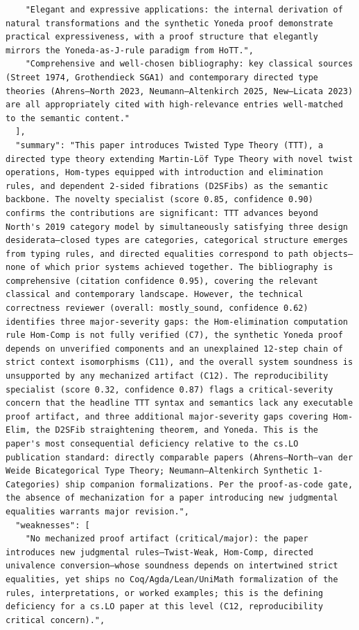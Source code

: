 \documentclass[11pt]{article}
\begin{document}
\begin{verbatim}
    "Elegant and expressive applications: the internal derivation of natural transformations and the synthetic Yoneda proof demonstrate practical expressiveness, with a proof structure that elegantly mirrors the Yoneda-as-J-rule paradigm from HoTT.",
    "Comprehensive and well-chosen bibliography: key classical sources (Street 1974, Grothendieck SGA1) and contemporary directed type theories (Ahrens–North 2023, Neumann–Altenkirch 2025, New–Licata 2023) are all appropriately cited with high-relevance entries well-matched to the semantic content."
  ],
  "summary": "This paper introduces Twisted Type Theory (TTT), a directed type theory extending Martin-Löf Type Theory with novel twist operations, Hom-types equipped with introduction and elimination rules, and dependent 2-sided fibrations (D2SFibs) as the semantic backbone. The novelty specialist (score 0.85, confidence 0.90) confirms the contributions are significant: TTT advances beyond North's 2019 category model by simultaneously satisfying three design desiderata—closed types are categories, categorical structure emerges from typing rules, and directed equalities correspond to path objects—none of which prior systems achieved together. The bibliography is comprehensive (citation confidence 0.95), covering the relevant classical and contemporary landscape. However, the technical correctness reviewer (overall: mostly_sound, confidence 0.62) identifies three major-severity gaps: the Hom-elimination computation rule Hom-Comp is not fully verified (C7), the synthetic Yoneda proof depends on unverified components and an unexplained 12-step chain of strict context isomorphisms (C11), and the overall system soundness is unsupported by any mechanized artifact (C12). The reproducibility specialist (score 0.32, confidence 0.87) flags a critical-severity concern that the headline TTT syntax and semantics lack any executable proof artifact, and three additional major-severity gaps covering Hom-Elim, the D2SFib straightening theorem, and Yoneda. This is the paper's most consequential deficiency relative to the cs.LO publication standard: directly comparable papers (Ahrens–North–van der Weide Bicategorical Type Theory; Neumann–Altenkirch Synthetic 1-Categories) ship companion formalizations. Per the proof-as-code gate, the absence of mechanization for a paper introducing new judgmental equalities warrants major revision.",
  "weaknesses": [
    "No mechanized proof artifact (critical/major): the paper introduces new judgmental rules—Twist-Weak, Hom-Comp, directed univalence conversion—whose soundness depends on intertwined strict equalities, yet ships no Coq/Agda/Lean/UniMath formalization of the rules, interpretations, or worked examples; this is the defining deficiency for a cs.LO paper at this level (C12, reproducibility critical concern).",

\end{verbatim}
\end{document}
